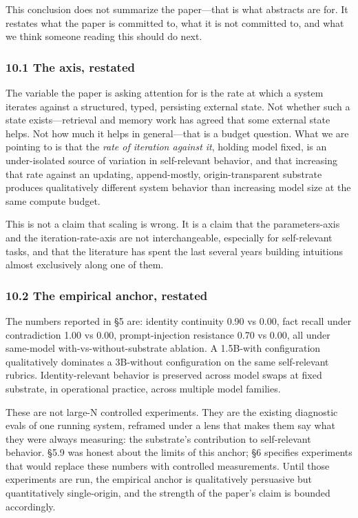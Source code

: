 \documentclass[11pt,letterpaper]{article}
\begin{document}
This conclusion does not summarize the paper---that is what abstracts are for. It restates what the paper is committed to, what it is not committed to, and what we think someone reading this should do next.

\subsubsection*{10.1 The axis, restated}

The variable the paper is asking attention for is the rate at which a system iterates against a structured, typed, persisting external state. Not whether such a state exists---retrieval and memory work has agreed that some external state helps. Not how much it helps in general---that is a budget question. What we are pointing to is that the \emph{rate of iteration against it}, holding model fixed, is an under-isolated source of variation in self-relevant behavior, and that increasing that rate against an updating, append-mostly, origin-transparent substrate produces qualitatively different system behavior than increasing model size at the same compute budget.

This is not a claim that scaling is wrong. It is a claim that the parameters-axis and the iteration-rate-axis are not interchangeable, especially for self-relevant tasks, and that the literature has spent the last several years building intuitions almost exclusively along one of them.

\subsubsection*{10.2 The empirical anchor, restated}

The numbers reported in §5 are: identity continuity 0.90 vs 0.00, fact recall under contradiction 1.00 vs 0.00, prompt-injection resistance 0.70 vs 0.00, all under same-model with-vs-without-substrate ablation. A 1.5B-with configuration qualitatively dominates a 3B-without configuration on the same self-relevant rubrics. Identity-relevant behavior is preserved across model swaps at fixed substrate, in operational practice, across multiple model families.

These are not large-N controlled experiments. They are the existing diagnostic evals of one running system, reframed under a lens that makes them say what they were always measuring: the substrate's contribution to self-relevant behavior. §5.9 was honest about the limits of this anchor; §6 specifies experiments that would replace these numbers with controlled measurements. Until those experiments are run, the empirical anchor is qualitatively persuasive but quantitatively single-origin, and the strength of the paper's claim is bounded accordingly.
\end{document}
